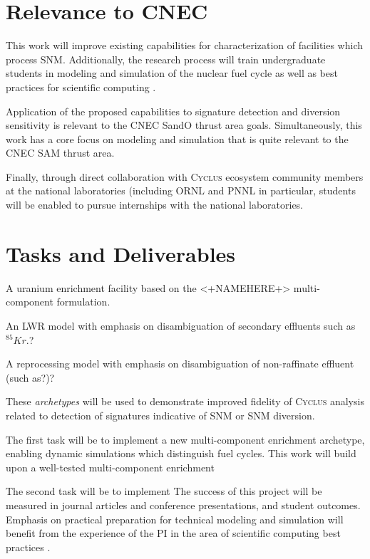 \documentclass[letterpaper]{article}
\newcommand{\Cyclus}{\textsc{Cyclus}\xspace}%
\begin{document}
\section{Relevance to CNEC}
This work will improve existing capabilities for characterization of facilities
which process \gls{SNM}. Additionally, the research process will train undergraduate students in modeling and simulation of the nuclear fuel cycle as well as best practices for scientific computing \cite{wilson_best_2014}. 


Application of the proposed capabilities to signature detection and diversion sensitivity is relevant to the \gls{CNEC} \gls{SandO} thrust area goals.  Simultaneously, this work has a core focus on modeling and simulation that is quite relevant to the \gls{CNEC} \gls{SAM} thrust area.  

Finally, through direct collaboration with \Cyclus ecosystem community members at the national laboratories (including \gls{ORNL} and \gls{PNNL} in particular, students will be enabled to pursue internships with the national laboratories.

\section{Tasks and Deliverables}

A uranium enrichment facility based on the <+NAMEHERE+> multi-component formulation.

An \gls{LWR} model with emphasis on disambiguation of secondary effluents such as $^{85}Kr$.?

A reprocessing model with emphasis on disambiguation of non-raffinate effluent (such as?)?

These \emph{archetypes} will be used to demonstrate improved fidelity of 
\Cyclus analysis related to detection of signatures indicative of \gls{SNM} or 
\gls{SNM} diversion. 

The first task will be to implement a new multi-component enrichment archetype, 
enabling dynamic simulations which distinguish fuel cycles. This work will build upon a well-tested multi-component enrichment  

The second task will be to implement
The success of this project will be measured in journal articles and conference 
presentations, and student outcomes. Emphasis on practical preparation for 
technical modeling and simulation will benefit from the experience of the 
\gls{PI} in the area of scientific computing best practices 
\cite{scopatz_effective_2015,wilson_best_2014,huff_lessons_2017,huff_case_2017}.
\end{document}

